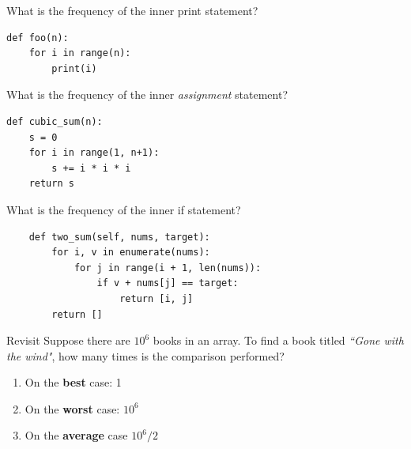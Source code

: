 \documentclass[aspectratio=169, 14pt]{beamer}
\begin{document}
\begin{frame}[fragile]

    {\large {}} What is the frequency of the inner \alert{print} statement?
\begin{verbatim}
def foo(n):
    for i in range(n):
        print(i)
\end{verbatim}

{\large {}} What is the frequency of the inner \emph{assignment} statement?
\begin{verbatim}
def cubic_sum(n):
    s = 0
    for i in range(1, n+1):
        s += i * i * i
    return s
\end{verbatim}
\end{frame}

\begin{frame}[fragile]

    {\large {}} What is the frequency of the inner \alert{if} statement?
    \begin{verbatim}
    def two_sum(self, nums, target):
        for i, v in enumerate(nums):
            for j in range(i + 1, len(nums)):
                if v + nums[j] == target:
                    return [i, j]
        return []
    \end{verbatim}
    

\end{frame}

\begin{frame}
    \begin{block}{Revisit}
        Suppose there are $10^6$ books in an array. To find a book titled \emph{``Gone with the wind"}, how many times is the comparison performed?
        \begin{enumerate}
            \item On the \textbf{best} case: 1 
            \item On the \textbf{worst} case: $10^6$
            \item On the \textbf{average} case $10^6/2$
        \end{enumerate}
    \end{block}
\end{frame}
\end{document}
